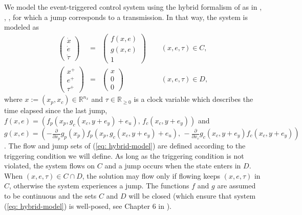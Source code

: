 \documentclass[a4paper, 9pt, twocolumn]{IEEEtran}
\theoremstyle{plain}
\theoremstyle{definition}
\newcommand{\R}[2]{\ensuremath{\mathbb{R}^{#1}_{#2}}}
\begin{document}
We model the event-triggered control system using the hybrid formalism of \cite{Teel} as in \cite{Donkers2012output}, \cite{Forni2014event}, \cite{Romain2011unifying}, for which a jump corresponds to a transmission. In that way, the system is modeled as
\begin{equation} \label{eq: hybrid-model}
\begin{array}{rllll}
\left(\begin{array}{c} \dot{x}\\ \dot{e}\\ \dot{\tau}\end{array} \right) &=& \left(\begin{array}{c} f(x,e)\\ g(x,e)\\ 1\end{array} \right) &\hspace{15pt}(x,e,\tau)\in C, \\[15pt]
  \left(\begin{array}{c} x^{+}\\ e^{+}\\ \tau^{+}\end{array} \right) &=& \left(\begin{array}{c} x\\ 0\\ 0\end{array} \right) &\hspace{15pt} (x,e,\tau) \in D,
\end{array}
\end{equation}
where $x:=(x_{p}, x_{c}) \in \R{n_{x}}{}$ and $\tau \in \R{}{\geq 0}$ is a clock variable which describes the time elapsed since the last jump,
$f(x,e) = ( f_{p}(x_{p},g_{c}(x_{c}, y + e_{y}) + e_{u}),\, f_{c}(x_{c}, y + e_{y}))$  and \\
$g(x,e) = (-\frac{\partial}{\partial x_{p}}g_{p}(x_{p})f_{p}(x_{p},g_{c}(x_{c}, y + e_{y}) + e_{u}),\, - \frac{\partial}{\partial x_{c}}g_{c}(x_{c}, y + e_{y})f_{c}(x_{c}, y + e_{y}) )$.
The flow and jump sets of (\ref{eq: hybrid-model}) are defined according to the triggering condition we will define. As long as the triggering condition is not violated, the system flows on $C$ and a jump occurs when the state enters in $D$. When $(x,e,\tau) \in C \cap D$, the solution may flow only if flowing keeps $(x,e,\tau)$ in $C$, otherwise the system experiences a jump. The functions $f$ and $g$ are assumed to be continuous and the sets $C$ and $D$ will be closed (which ensure that system (\ref{eq: hybrid-model}) is well-posed, see Chapter 6 in \cite{Teel}).
\end{document}
